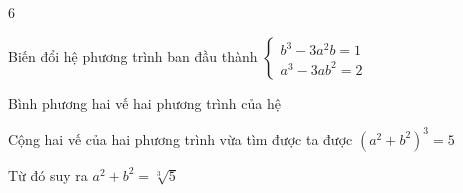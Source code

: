 \begin{Solbook}{6}
 \par \noindent  Biến đổi hệ phương trình ban đầu thành $\begin {cases} b^3-3a^2b=1\\ a^3-3ab^2=2 \end {cases}$ \par Bình phương hai vế hai phương trình của hệ \par Cộng hai vế của hai phương trình vừa tìm được ta được $(a^2+b^2)^3=5$ \par Từ đó suy ra $a^2+b^2=\sqrt [3]{5}$  \hfill \qedEX 
\end{Solbook}

